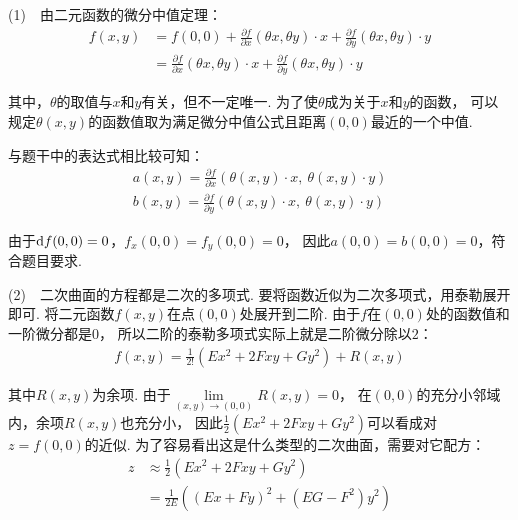 \begin{solution}
(1)~~由二元函数的微分中值定理：
\begin{equation}
    \begin{aligned}
        f(x,y) &= f(0,0) + \frac{\partial f}{\partial x}(\theta x, \theta y) \cdot x
        + \frac{\partial f}{\partial y}(\theta x, \theta y) \cdot y \\
        &= \frac{\partial f}{\partial x}(\theta x, \theta y) \cdot x
        + \frac{\partial f}{\partial y}(\theta x, \theta y) \cdot y
        \nonumber
    \end{aligned}
\end{equation}

其中，$\theta$的取值与$x$和$y$有关，但不一定唯一.
为了使$\theta$成为关于$x$和$y$的函数，
可以规定$\theta (x,y)$的函数值取为满足微分中值公式且距离$(0,0)$最近的一个中值.

与题干中的表达式相比较可知：
\begin{equation}
    \begin{aligned}
        a(x,y) = \frac{\partial f}{\partial x}(\theta(x,y) \cdot x, ~\theta(x,y) \cdot y) \\
        b(x,y) = \frac{\partial f}{\partial y}(\theta(x,y) \cdot x, ~\theta(x,y) \cdot y)
    \end{aligned}
    \nonumber
\end{equation}

由于$\mathrm{d} f (0,0) = 0$，$f_x(0,0) = f_y(0,0) = 0$，
因此$a(0,0) = b(0,0) =0$，符合题目要求.

(2)~~二次曲面的方程都是二次的多项式.
要将函数近似为二次多项式，用泰勒展开即可.
将二元函数$f(x,y)$在点$(0,0)$处展开到二阶.
由于$f$在$(0,0)$处的函数值和一阶微分都是$0$，
所以二阶的泰勒多项式实际上就是二阶微分除以$2$：
\begin{equation}
    \begin{aligned}
        f(x,y) = \frac{1}{2!} \left( E x^2 + 2F xy + G y^2 \right) + R(x,y)
    \end{aligned}
    \nonumber
\end{equation}

其中$R(x,y)$为余项.
由于$\lim\limits_{(x,y) \to (0,0)} R(x,y)= 0$，
在$(0,0)$的充分小邻域内，余项$R(x,y)$也充分小，
因此$\frac{1}{2}\left(Ex^2 + 2Fxy + Gy^2\right)$可以看成对$z = f(0,0)$的近似.
为了容易看出这是什么类型的二次曲面，需要对它配方：
\begin{equation}
    \begin{aligned}
        z &\approx \frac{1}{2}\left(Ex^2 + 2Fxy + Gy^2\right) \\
        &= \frac{1}{2E} \left( \left( Ex + Fy\right)^2 + (EG - F^2)y^2  \right)
    \end{aligned}
    \nonumber
\end{equation}


\end{solution}
